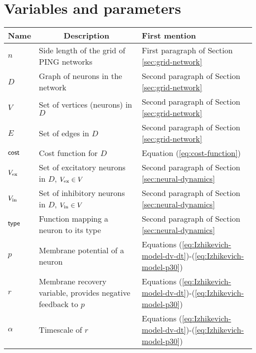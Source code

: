 \section{Variables and parameters}

\begin{longtable}{|m{}|m{}|m{}|}
\hline
\rowcolor{main-color} 
\textbf{Name} & \multicolumn{1}{c|}{\cellcolor{main-color}\textbf{Description}} & \textbf{First mention} \\ \hline

$n$ & Side length of the grid of PING networks & First paragraph of Section \ref{sec:grid-network}    \\ \hline

$D$ & Graph of neurons in the network & Second paragraph of Section \ref{sec:grid-network}   \\ \hline

$V$ & Set of vertices (neurons) in $D$ & Second paragraph of Section \ref{sec:grid-network}   \\ \hline

$E$ & Set of edges in $D$  & Second paragraph of Section \ref{sec:grid-network}   \\ \hline

$\mathsf{cost}$ & Cost function for $D$ & Equation (\ref{eq:cost-function})  \\ \hline

$V_{\mathrm{ex}}$ & Set of excitatory neurons in $D$, $V_{\mathrm{ex}} \in V$ & Second paragraph of Section \ref{sec:neural-dynamics}   \\ \hline

$V_{\mathrm{in}}$ & Set of inhibitory neurons in $D$, $V_{\mathrm{in}} \in V$ & Second paragraph of Section \ref{sec:neural-dynamics}   \\ \hline

$\mathsf{type}$ & Function mapping a neuron to its type & Second paragraph of Section \ref{sec:neural-dynamics}   \\ \hline

$p$ & Membrane potential of a neuron & Equations (\ref{eq:Izhikevich-model-dv-dt})-(\ref{eq:Izhikevich-model-p30}) \\ \hline

$r$ & Membrane recovery variable, provides negative feedback to $p$ & Equations (\ref{eq:Izhikevich-model-dv-dt})-(\ref{eq:Izhikevich-model-p30}) \\ \hline

$\alpha$ & Timescale of $r$ & Equations (\ref{eq:Izhikevich-model-dv-dt})-(\ref{eq:Izhikevich-model-p30}) \\ \hline


\end{longtable}

